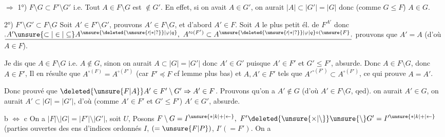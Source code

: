  $\Rightarrow$ 1°) $F\setminus G\subset F'\setminus G'$ i.e. Tout $A\in F\setminus G$ est $\notin G'$. En effet, si on avait $A\in G'$, on aurait $|A|\subset|G'|=|G|$ donc  (comme $G\leq F$) $A\in G$.


2°) $F'\setminus G'\subset F\setminus G$ Soit $A'\in F'\setminus G'$, prouvons $A'\in F\setminus G$, et d'abord $A'\in F$.  Soit $A$ le plus petit él. de $F^{A'}$ donc $\underline{\rule[-.15ex]{.35pt}{.55ex}\,A'\unsure{\subset|\in|\subseteq} A^{\unsure{\deleted{\unsure{\prime|\ast|?}}|\varphi|q}},\ A'^{\circ(F')}\subset A^{\unsure{\deleted{\unsure{\prime|\ast|?}}|\varphi|q}\circ(\unsure{F}}\,\rule[-.15ex]{.35pt}{.55ex}}$ prouvons que $A'=A$ (d'où $A\in F$). 

Je dis que $A\in F\setminus G$ i.e. $A\notin G$, sinon on aurait $A\subset|G|=|G'|$ donc $A'\in G'$ puisque $A'\in F'$ et $G'\leq F'$, absurde.  Donc $A\in F\setminus G$, donc $A\in F'$,  Il en résulte que $A^{\circ(F)}=A^{\circ(F')}$ (car $F'\preceq F$\deleted{)} cf lemme plus bas) et   $A,A'\in F'$ tels que $A'^{\circ(F')}\subset A^{\circ(F')}$, ce qui prouve $A=A'$.

Donc  prouvé que $\deleted{\unsure{F|A}}A'\in F'\setminus G'\Rightarrow A'\in F$. Prouvons qu'on a $A'\notin G$ (d'où $A'\in F\setminus G$\deleted{)}, qed).  on aurait $A'\in G$, on aurait $A'\subset |G|=|G'|$, d'où (comme $A'\in F'$ et $G'\leq F'$) $A'\in G'$, absurde.


b $\Longleftrightarrow$ c  On a $|F|\setminus|G|=|F'|\setminus|G'|$, soit $U$, Posons $F\setminus G=I^{\unsure{\ast|k|+|\leftarrow}},\ F'\deleted{\unsure{\times|\setminus}}\unsure{\setminus}G'=I'^{\unsure{\ast|k|+|\leftarrow}}$ (parties ouvertes des ens d'indices ordonnés $I$,  $(=\unsure{F|P})$, $I'(=F')$. On a
